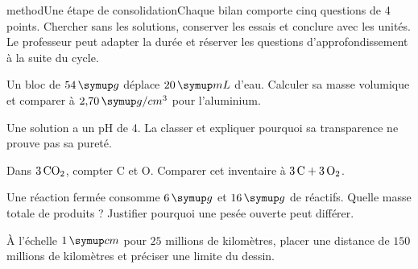 \label{bilans}
\begin{pcEncadre}{method}{Une étape de consolidation}Chaque bilan comporte cinq questions de 4 points. Chercher sans les solutions, conserver les essais et conclure avec les unités. Le professeur peut adapter la durée et réserver les questions d’approfondissement à la suite du cycle.\end{pcEncadre}
\label{sujet-B1}
\par\noindent\begin{minipage}{\linewidth}
Un bloc de $54\unite g$ déplace $20\unite{mL}$ d’eau. Calculer sa masse volumique et comparer à $2{,}70\unite{g/cm^3}$ pour l’aluminium.\par
\end{minipage}\par
\par\noindent\begin{minipage}{\linewidth}
Une solution a un pH de 4. La classer et expliquer pourquoi sa transparence ne prouve pas sa pureté.\par
\end{minipage}\par
\par\noindent\begin{minipage}{\linewidth}
Dans $3\,\ce{CO2}$, compter C et O. Comparer cet inventaire à $3\,\ce C+3\,\ce{O2}$.\par
\end{minipage}\par
\par\noindent\begin{minipage}{\linewidth}
Une réaction fermée consomme $6\unite g$ et $16\unite g$ de réactifs. Quelle masse totale de produits ? Justifier pourquoi une pesée ouverte peut différer.\par
\end{minipage}\par
\par\noindent\begin{minipage}{\linewidth}
À l’échelle $1\unite{cm}$ pour $25$ millions de kilomètres, placer une distance de $150$ millions de kilomètres et préciser une limite du dessin.\par
\end{minipage}\par
